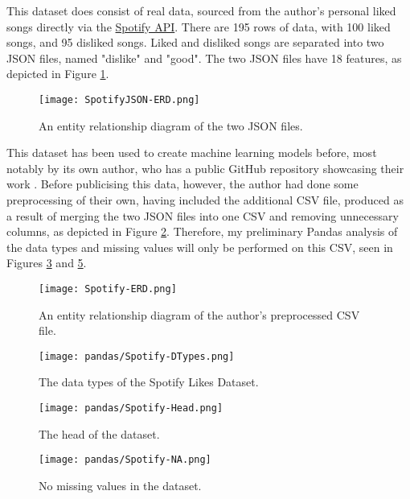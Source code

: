 \noindent This dataset does consist of real data, sourced from the author's personal liked songs directly via the 
\href{https://developer.spotify.com/documentation/web-api}{Spotify API}. There are 195 rows of data, with 100 liked songs, and 95 disliked songs.
Liked and disliked songs are separated into two JSON files, named "dislike" and "good". The two JSON files have 18 features, as depicted in Figure 
\ref{fig:JSON-ERD}. 

\begin{figure}[H]
    \centering
    \texttt{[image: SpotifyJSON-ERD.png]}
    \caption{An entity relationship diagram of the two JSON files.}
    \label{fig:JSON-ERD}
\end{figure}

This dataset has been used to create machine learning models before, most notably by its own author, who has a public GitHub repository 
showcasing their work \autocite{brice-vergnou_brice-vergnouspotify_recommendation_2024}. 
Before publicising this data, however, the author had done some preprocessing of their own, having included the additional CSV file,
produced as a result of merging the two JSON files into one CSV and removing unnecessary columns, as depicted in Figure \ref{fig:Spotify-ERD}.
Therefore, my preliminary Pandas analysis of the data types and missing values will only be performed on this CSV, seen in Figures \ref{fig:Spotify-DTypes}
and \ref{fig:Spotify-NA}.

\begin{figure}[H]
    \centering
    \texttt{[image: Spotify-ERD.png]}
    \caption{An entity relationship diagram of the author's preprocessed CSV file.}
    \label{fig:Spotify-ERD}
\end{figure}

\begin{figure}[H]
    \centering
    \texttt{[image: pandas/Spotify-DTypes.png]}
    \caption{The data types of the Spotify Likes Dataset.}
    \label{fig:Spotify-DTypes}
\end{figure}

\begin{figure}[H]
    \centering
    \texttt{[image: pandas/Spotify-Head.png]}
    \caption{The head of the dataset.}
    \label{fig:Spotify-Head}
\end{figure}

\begin{figure}[H]
    \centering
    \texttt{[image: pandas/Spotify-NA.png]}
    \caption{No missing values in the dataset.}
    \label{fig:Spotify-NA}
\end{figure}

